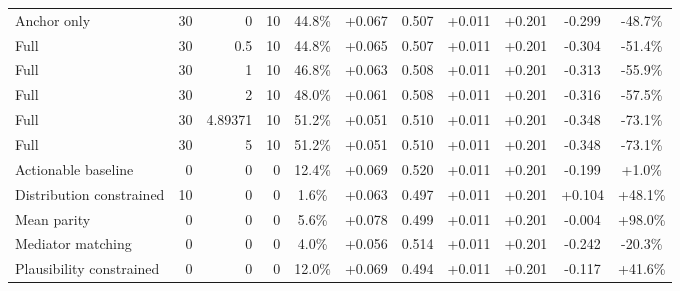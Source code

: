 \begin{table}[htbp]
\begin{tabular}{lrrrccccccc}
Anchor only & 30 & 0 & 10 & 44.8\% & +0.067 & 0.507 & +0.011 & +0.201 & -0.299 & -48.7\% \\
Full & 30 & 0.5 & 10 & 44.8\% & +0.065 & 0.507 & +0.011 & +0.201 & -0.304 & -51.4\% \\
Full & 30 & 1 & 10 & 46.8\% & +0.063 & 0.508 & +0.011 & +0.201 & -0.313 & -55.9\% \\
Full & 30 & 2 & 10 & 48.0\% & +0.061 & 0.508 & +0.011 & +0.201 & -0.316 & -57.5\% \\
Full & 30 & 4.89371 & 10 & 51.2\% & +0.051 & 0.510 & +0.011 & +0.201 & -0.348 & -73.1\% \\
Full & 30 & 5 & 10 & 51.2\% & +0.051 & 0.510 & +0.011 & +0.201 & -0.348 & -73.1\% \\
Actionable baseline & 0 & 0 & 0 & 12.4\% & +0.069 & 0.520 & +0.011 & +0.201 & -0.199 & +1.0\% \\
Distribution constrained & 10 & 0 & 0 & 1.6\% & +0.063 & 0.497 & +0.011 & +0.201 & +0.104 & +48.1\% \\
Mean parity & 0 & 0 & 0 & 5.6\% & +0.078 & 0.499 & +0.011 & +0.201 & -0.004 & +98.0\% \\
Mediator matching & 0 & 0 & 0 & 4.0\% & +0.056 & 0.514 & +0.011 & +0.201 & -0.242 & -20.3\% \\
Plausibility constrained & 0 & 0 & 0 & 12.0\% & +0.069 & 0.494 & +0.011 & +0.201 & -0.117 & +41.6\% \\
\bottomrule
\end{tabular}
\end{table}
